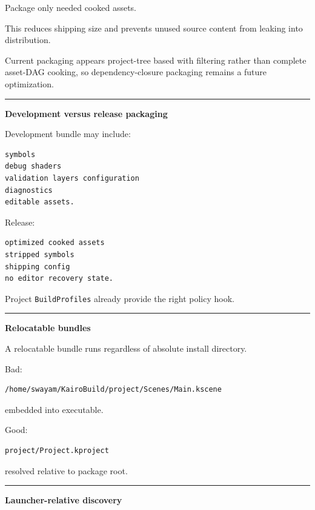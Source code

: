 Package only needed cooked assets.

This reduces shipping size and prevents unused source content from leaking into distribution.

Current packaging appears project-tree based with filtering rather than complete asset-DAG cooking, so dependency-closure packaging remains a future optimization.

\begin{center}\rule{0.5\linewidth}{0.5pt}\end{center}

\textbf{Development versus release packaging}

Development bundle may include:

\begin{verbatim}
symbols
debug shaders
validation layers configuration
diagnostics
editable assets.
\end{verbatim}

Release:

\begin{verbatim}
optimized cooked assets
stripped symbols
shipping config
no editor recovery state.
\end{verbatim}

Project \texttt{BuildProfiles} already provide the right policy hook.

\begin{center}\rule{0.5\linewidth}{0.5pt}\end{center}

\textbf{Relocatable bundles}

A relocatable bundle runs regardless of absolute install directory.

Bad:

\begin{verbatim}
/home/swayam/KairoBuild/project/Scenes/Main.kscene
\end{verbatim}

embedded into executable.

Good:

\begin{verbatim}
project/Project.kproject
\end{verbatim}

resolved relative to package root.

\begin{center}\rule{0.5\linewidth}{0.5pt}\end{center}

\textbf{Launcher-relative discovery}

